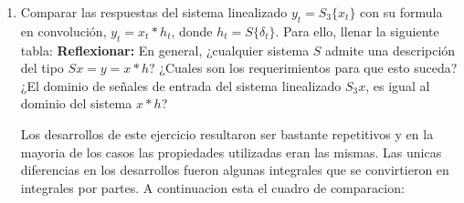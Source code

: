 \documentclass[12pt,a4paper]{report}
\begin{document}
\begin{enumerate}[label=\alph*)]
    \item Comparar las respuestas del sistema linealizado $y_t = S_3\{x_t\}$ con su formula en convolución,
      $y_t = x_t * h_t$, donde $h_t = S\{\delta_t\}$. Para ello, llenar la siguiente tabla:
      \textbf{Reflexionar:} En general, ¿cualquier sistema $S$ admite una descripción del tipo $S{x} = y = x * h$?
      ¿Cuales son los requerimientos para que esto suceda? ¿El dominio de señales de entrada del sistema linealizado
      $S_3{x}$, es igual al dominio del sistema $x * h$?

      Los desarrollos de este ejercicio resultaron ser bastante repetitivos y en la mayoria de los casos las
      propiedades utilizadas eran las mismas. Las unicas diferencias en los desarrollos fueron algunas integrales que
      se convirtieron en integrales por partes. A continuacion esta el cuadro de comparacion:\\
      

\end{enumerate}
\end{document}
